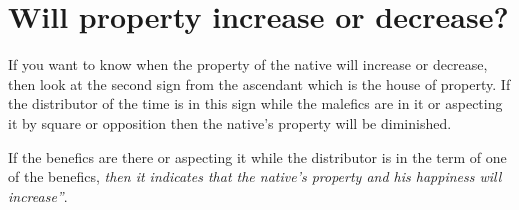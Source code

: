 \section{Will property increase or decrease?}
If you want to know when the property of the native will increase or decrease, then look at the second sign from the ascendant which is the house of property. If the distributor of the time is in this sign while the malefics are in it or aspecting it by square or opposition then the native's property will be diminished.

If the benefics are there or aspecting it while the distributor is in the term of one of the benefics, \textsl{then it indicates that the native's property and his happiness will increase''}.

